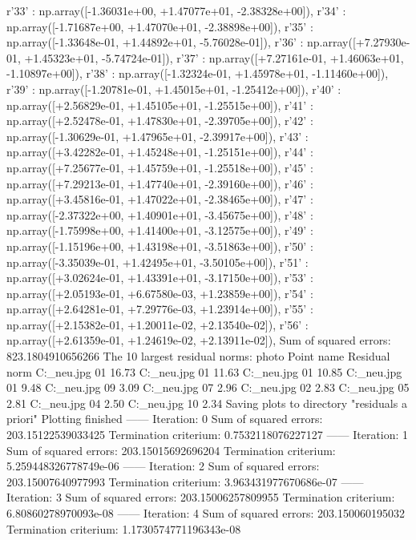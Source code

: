 r'33' : np.array([-1.36031e+00, +1.47077e+01, -2.38328e+00]),
r'34' : np.array([-1.71687e+00, +1.47070e+01, -2.38898e+00]),
r'35' : np.array([-1.33648e-01, +1.44892e+01, -5.76028e-01]),
r'36' : np.array([+7.27930e-01, +1.45323e+01, -5.74724e-01]),
r'37' : np.array([+7.27161e-01, +1.46063e+01, -1.10897e+00]),
r'38' : np.array([-1.32324e-01, +1.45978e+01, -1.11460e+00]),
r'39' : np.array([-1.20781e-01, +1.45015e+01, -1.25412e+00]),
r'40' : np.array([+2.56829e-01, +1.45105e+01, -1.25515e+00]),
r'41' : np.array([+2.52478e-01, +1.47830e+01, -2.39705e+00]),
r'42' : np.array([-1.30629e-01, +1.47965e+01, -2.39917e+00]),
r'43' : np.array([+3.42282e-01, +1.45248e+01, -1.25151e+00]),
r'44' : np.array([+7.25677e-01, +1.45759e+01, -1.25518e+00]),
r'45' : np.array([+7.29213e-01, +1.47740e+01, -2.39160e+00]),
r'46' : np.array([+3.45816e-01, +1.47022e+01, -2.38465e+00]),
r'47' : np.array([-2.37322e+00, +1.40901e+01, -3.45675e+00]),
r'48' : np.array([-1.75998e+00, +1.41400e+01, -3.12575e+00]),
r'49' : np.array([-1.15196e+00, +1.43198e+01, -3.51863e+00]),
r'50' : np.array([-3.35039e-01, +1.42495e+01, -3.50105e+00]),
r'51' : np.array([+3.02624e-01, +1.43391e+01, -3.17150e+00]),
r'53' : np.array([+2.05193e-01, +6.67580e-03, +1.23859e+00]),
r'54' : np.array([+2.64281e-01, +7.29776e-03, +1.23914e+00]),
r'55' : np.array([+2.15382e-01, +1.20011e-02, +2.13540e-02]),
r'56' : np.array([+2.61359e-01, +1.24619e-02, +2.13911e-02]),
Sum of squared errors: 823.1804910656266
The 10 largest residual norms:
photo	Point name	Residual norm
C:\Users\Clemens\Desktop\fotos_neu\1.jpg	01	16.73
C:\Users\Clemens\Desktop\fotos_neu\4.jpg	01	11.63
C:\Users\Clemens\Desktop\fotos_neu\2.jpg	01	10.85
C:\Users\Clemens\Desktop\fotos_neu\3.jpg	01	9.48
C:\Users\Clemens\Desktop\fotos_neu\4.jpg	09	3.09
C:\Users\Clemens\Desktop\fotos_neu\4.jpg	07	2.96
C:\Users\Clemens\Desktop\fotos_neu\1.jpg	02	2.83
C:\Users\Clemens\Desktop\fotos_neu\4.jpg	05	2.81
C:\Users\Clemens\Desktop\fotos_neu\3.jpg	04	2.50
C:\Users\Clemens\Desktop\fotos_neu\4.jpg	10	2.34
Saving plots to directory "residuals a priori"
Plotting finished
------ Iteration: 0
Sum of squared errors: 203.15122539033425
Termination criterium: 0.7532118076227127
------ Iteration: 1
Sum of squared errors: 203.15015692696204
Termination criterium: 5.259448326778749e-06
------ Iteration: 2
Sum of squared errors: 203.15007640977993
Termination criterium: 3.963431977670686e-07
------ Iteration: 3
Sum of squared errors: 203.15006257809955
Termination criterium: 6.80860278970093e-08
------ Iteration: 4
Sum of squared errors: 203.150060195032
Termination criterium: 1.1730574771196343e-08
